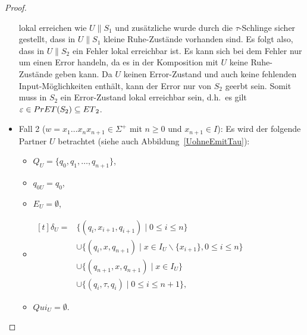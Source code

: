 \begin{proof}
\begin{itemize}
      lokal erreichen wie $U\|S_1$ und zusätzliche wurde durch die
      $\tau$-Schlinge sicher gestellt, dass in $U\|S_1$ kleine Ruhe-Zustände
      vorhanden sind. Es folgt also, dass in $U\|S_2$ ein Fehler lokal
      erreichbar ist. Es kann sich bei dem Fehler nur um einen Error handeln,
      da es in der Komposition mit $U$ keine Ruhe-Zustände geben kann. Da $U$
      keinen Error-Zustand und auch keine fehlenden Input-Möglichkeiten
      enthält, kann der Error nur von $S_2$ geerbt sein. Somit muss in $S_2$
      ein Error-Zustand lokal erreichbar sein, d.h.\ es gilt $\varepsilon\in
      PrET{}(S_2)\subseteq ET{}_2$.
    \item Fall 2 ($w=x_1\dots x_nx_{n+1}\in\Sigma ^+$ mit $n\geq 0$ und
      $x_{n+1}\in I$): Es wird der folgende Partner $U$ betrachtet (siehe auch
      Abbildung~\ref{UohneEmitTau}):
      \begin{itemize}
        \item $Q_U=\{q_0,q_1,\dots ,q_{n+1}\}$,
        \item $q_{0U}=q_0$,
        \item $E_U=\emptyset$,
        \item $\begin{aligned}[t]
            \delta _U=&\{(q_i,x_{i+1},q_{i+1})\mid  0\leq i\leq n\}\\
                      &\cup\{(q_i,x,q_{n+1})\mid  x\in I_U\backslash\{x_{i+1}\},
          0\leq i\leq n\}\\
          &\cup\{(q_{n+1},x,q_{n+1})\mid  x\in I_U\}\\
          &\cup\{(q_i,\tau,q_i)\mid 0\leq i\leq n+1\},
        \end{aligned}$
        \item $Qui_U = \emptyset$.
      \end{itemize}
      \begin{figure} [h!tbp]
      \begin{center}
\end{center}
\end{figure}
\end{itemize}
\end{proof}
